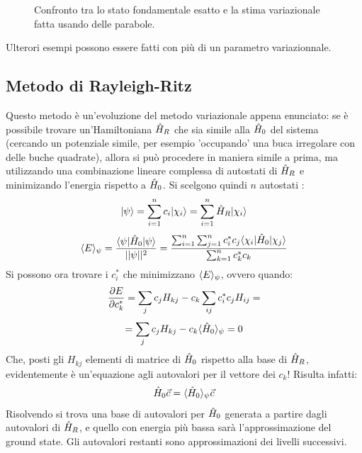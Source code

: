 \begin{figure}[h]
\centering
{}
\caption{Confronto tra lo stato fondamentale esatto e la stima variazionale fatta usando delle parabole.}
\end{figure}

Ulterori esempi possono essere fatti con più di un parametro variazionnale.

\subsection{Metodo di Rayleigh-Ritz}
Questo metodo è un'evoluzione del metodo variazionale appena enunciato: se è possibile trovare un'Hamiltoniana $\H_R$ che sia simile alla $\H_0$ del sistema (cercando un potenziale simile, per esempio 'occupando' una buca irregolare con delle buche quadrate), allora si può procedere in maniera simile a prima, ma utilizzando una combinazione lineare complessa di autostati di $\H_R$ e minimizando l'energia rispetto a $\H_0$. Si scelgono quindi $n$ autostati :
\[
	\Ket \psi = \sum_{i = 1}^n c_i \Ket {\chi_i} = \sum_{i = 1}^n \H_R \Ket {\chi_i} \]\[
	\avg[\psi] E = \frac{\braketin \psi {\H_0} \psi}{\sfabs \psi} = \frac{\sum_{i = 1}^n \sum_{j = 1}^n c_i^* c_j \braketin {\chi_i}{\H_0} {\chi_j}}{\sum_{k = 1}^n c_k^*c_k}
\]
Si possono ora trovare i $c_i^*$ che minimizzano $\avg[\psi] E$, ovvero quando:
\[
	\deriv[c_k^*]{E} = \sum_j c_j H_{kj} - c_k \sum_{ij}c_i^*c_jH_{ij} = \]\[
	= \sum_j c_j H_{kj} - c_k \avg[\psi]{\H_0} = 0
\]
Che, posti gli $H_{kj}$ elementi di matrice di $\H_0$ rispetto alla base di $\H_R$, evidentemente è un'equazione agli autovalori per il vettore dei $c_k$! Risulta infatti:
\[
	\H_0 \vec c = \avg[\psi]{\H_0}\vec c
\]
Risolvendo si trova una base di autovalori per $\H_0$ generata a partire dagli autovalori di $\H_R$, e quello con energia più bassa sarà l'approssimazione del ground state. Gli autovalori restanti sono approssimazioni dei livelli successivi.


